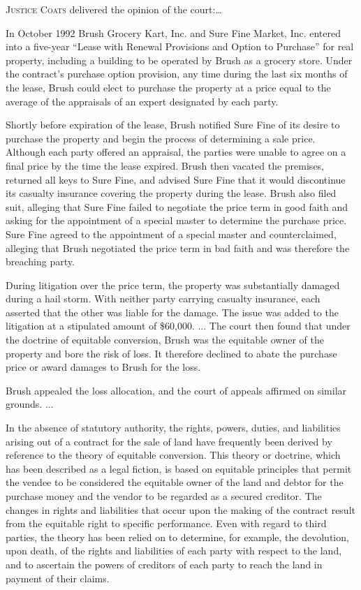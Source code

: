 
\opinion \textsc{Justice Coats} delivered the opinion of the court:\ldots

In October 1992 Brush Grocery Kart, Inc. and Sure Fine Market, Inc. entered into
a five-year ``Lease with Renewal Provisions and Option to Purchase'' for real
property, including a building to be operated by Brush as a grocery store.
Under the contract's purchase option provision, any time during the last six
months of the lease, Brush could elect to purchase the property at a price
equal to the average of the appraisals of an expert designated by each party. 

Shortly before expiration of the lease, Brush notified Sure Fine of its desire
to purchase the property and begin the process of determining a sale price.
Although each party offered an appraisal, the parties were unable to agree on a
final price by the time the lease expired. Brush then vacated the premises,
returned all keys to Sure Fine, and advised Sure Fine that it would discontinue
its casualty insurance covering the property during the lease. Brush also filed
suit, alleging that Sure Fine failed to negotiate the price term in good faith
and asking for the appointment of a special master to determine the purchase
price. Sure Fine agreed to the appointment of a special master and
counterclaimed, alleging that Brush negotiated the price term in bad faith and
was therefore the breaching party. 

During litigation over the price term, the property was substantially damaged
during a hail storm. With neither party carrying casualty insurance, each
asserted that the other was liable for the damage. The issue was added to the
litigation at a stipulated amount of \$60,000. ... The court then found that
under the doctrine of equitable conversion, Brush was the equitable owner of
the property and bore the risk of loss. It therefore declined to abate the
purchase price or award damages to Brush for the loss. 

Brush appealed the loss allocation, and the court of appeals affirmed on similar
grounds. ... 

In the absence of statutory authority, the rights, powers, duties, and
liabilities arising out of a contract for the sale of land have frequently been
derived by reference to the theory of equitable conversion. This theory or
doctrine, which has been described as a legal fiction, is based on equitable
principles that permit the vendee to be considered the equitable owner of the
land and debtor for the purchase money and the vendor to be regarded as a
secured creditor. The changes in rights and liabilities that occur upon the
making of the contract result from the equitable right to specific performance.
Even with regard to third parties, the theory has been relied on to determine,
for example, the devolution, upon death, of the rights and liabilities of each
party with respect to the land, and to ascertain the powers of creditors of
each party to reach the land in payment of their claims. 

